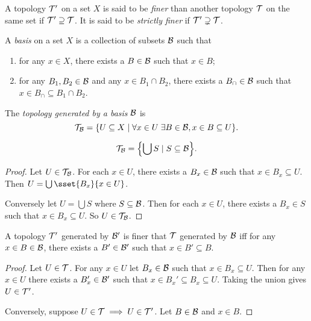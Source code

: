 \begin{definition}[Refinement] \label{def:refinement}
    A topology $\mathcal{T}'$ on a set $X$ is said to be \emph{finer} than
    another topology $\mathcal{T}$ on the same set if $\mathcal{T}' \supseteq \mathcal{T}$.
    It is said to be \emph{strictly finer} if $\mathcal{T}' \supsetneq \mathcal{T}$.
\end{definition}

\begin{definition*}[Basis] \label{def:basis}
    A \emph{basis} on a set $X$ is a collection
    of subsets $\mathcal{B}$ such that
    \begin{enumerate}[label=\small(B\arabic*)]
        \item for any $x \in X$, there exists a $B \in \mathcal{B}$
            such that $x \in B$;
        \item for any $B_1, B_2 \in \mathcal{B}$ and any $x \in B_1 \cap B_2$,
            there exists a $B_\cap \in \mathcal{B}$ such that
            $x \in B_\cap \subseteq B_1 \cap B_2$.
    \end{enumerate}
\end{definition*}

\begin{definition*}
    The \emph{topology generated by a basis} $\mathcal{B}$ is \[
        \mathcal{T}_{\mathcal{B}} = \{U \subseteq X \mid
            \forall x \in U\; \exists B \in \mathcal{B}, x \in B \subseteq U\}.
    \]
\end{definition*}
\begin{corollary}
    \[
        \T_\mcB = \set*{\bigcup S \mid S \subseteq \mcB}.
    \]
\end{corollary}
\begin{proof}
    Let $U \in \mathcal{T}_{\mathcal{B}}$.
    For each $x \in U$, there exists a $B_x \in \mathcal{B}$ such that
    $x \in B_x \subseteq U$.
    Then $U = \bigcup \sset{B_x}{x \in U}$.

    Conversely let $U = \bigcup S$ where $S \subseteq \mathcal{B}$.
    Then for each $x \in U$, there exists a $B_x \in S$ such that
    $x \in B_x \subseteq U$.
    So $U \in \mathcal{T}_{\mathcal{B}}$.
\end{proof}

\begin{proposition} \label{thm:finer-basis}
    A topology $\mathcal{T}'$ generated by $\mathcal{B}'$ is finer that
    $\mathcal{T}$ generated by $\mathcal{B}$ iff
    for any $x \in B \in \mathcal{B}$, there exists a $B' \in \mathcal{B}'$ such that
    $x \in B' \subseteq B$.
\end{proposition}
\begin{proof}
    Let $U \in \mathcal{T}$.
    For any $x \in U$ let $B_x \in \mathcal{B}$ such that $x \in B_x \subseteq U$.
    Then for any $x \in U$ there exists a $B_x' \in \mathcal{B}'$ such that
    $x \in B_x' \subseteq B_x \subseteq U$.
    Taking the union gives $U \in \mathcal{T}'$.

    Conversely, suppose $U \in \mathcal{T} \implies U \in \mathcal{T}'$.
    Let $B \in \mathcal{B}$ and $x \in B$.
\end{proof}
